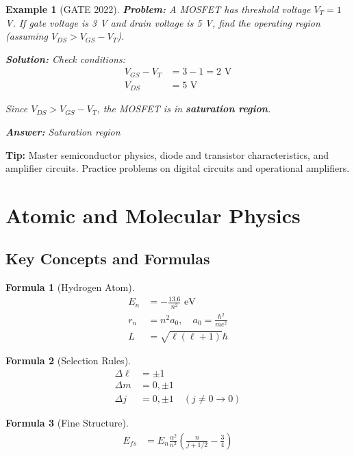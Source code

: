 \documentclass[12pt,a4paper]{article}
\newtheorem{example}{Example}[section]
\newtheorem{formula}{Formula}[section]
\newcommand{\ans}[1]{\textcolor{red!70!black}{\textbf{Answer:} #1}}
\newcommand{\sol}{\textcolor{blue!70!black}{\textbf{Solution:}}}
\newcommand{\tip}[1]{\textcolor{green!60!black}{\textbf{Tip:} #1}}
\begin{document}
\begin{example}[GATE 2022]
\textbf{Problem:} A MOSFET has threshold voltage $V_T = 1$ V. If gate voltage is 3 V and drain voltage is 5 V, find the operating region (assuming $V_{DS} > V_{GS} - V_T$).

\sol
Check conditions:
\begin{align}
V_{GS} - V_T &= 3 - 1 = 2 \text{ V}\\
V_{DS} &= 5 \text{ V}
\end{align}

Since $V_{DS} > V_{GS} - V_T$, the MOSFET is in \textbf{saturation region}.

\ans{Saturation region}
\end{example}

\tip{Master semiconductor physics, diode and transistor characteristics, and amplifier circuits. Practice problems on digital circuits and operational amplifiers.}

\section{Atomic and Molecular Physics}

\subsection{Key Concepts and Formulas}

\begin{formula}[Hydrogen Atom]
\begin{align}
E_n &= -\frac{13.6}{n^2} \text{ eV}\\
r_n &= n^2 a_0, \quad a_0 = \frac{\hbar^2}{me^2}\\
L &= \sqrt{\ell(\ell+1)}\hbar
\end{align}
\end{formula}

\begin{formula}[Selection Rules]
\begin{align}
\Delta \ell &= \pm 1\\
\Delta m &= 0, \pm 1\\
\Delta j &= 0, \pm 1 \quad (j \neq 0 \to 0)
\end{align}
\end{formula}

\begin{formula}[Fine Structure]
\begin{align}
E_{fs} &= E_n \frac{\alpha^2}{n^2}\left(\frac{n}{j+1/2} - \frac{3}{4}\right)
\end{align}
\end{formula}
\end{document}
